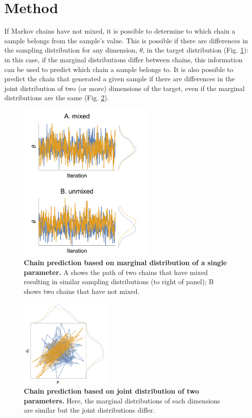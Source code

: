 \documentclass{article}
\begin{document}
\section{Method}\label{sec:method}
If Markov chains have not mixed, it is possible to determine to which chain a sample belongs from the sample's value. This is possible if there are differences in the sampling distribution for any dimension, $\theta$, in the target distribution (Fig. \ref{fig:marginal}): in this case, if the marginal distributions differ between chains, this information can be used to predict which chain a sample belongs to. It  is also possible to predict the chain that generated a given sample if there are differences in the joint distribution of two (or more) dimensions of the target, even if the marginal distributions are the same (Fig. \ref{fig:joint}).

\begin{figure}[h]
	\centerline{\includegraphics[width=0.6\textwidth]{../output/unmixed_1.pdf}}
	\caption{\textbf{Chain prediction based on marginal distribution of a single parameter.} A shows the path of two chains that have mixed resulting in similar sampling distributions (to right of panel); B shows two chains that have not mixed.}
	\label{fig:marginal}
\end{figure}

\begin{figure}[h]
	\centerline{\includegraphics[width=0.4\textwidth]{../output/unmixed_2.pdf}}
	\caption{\textbf{Chain prediction based on joint distribution of two parameters.} Here, the marginal distributions of each dimensions are similar but the joint distributions differ.}
	\label{fig:joint}
\end{figure}
\end{document}

